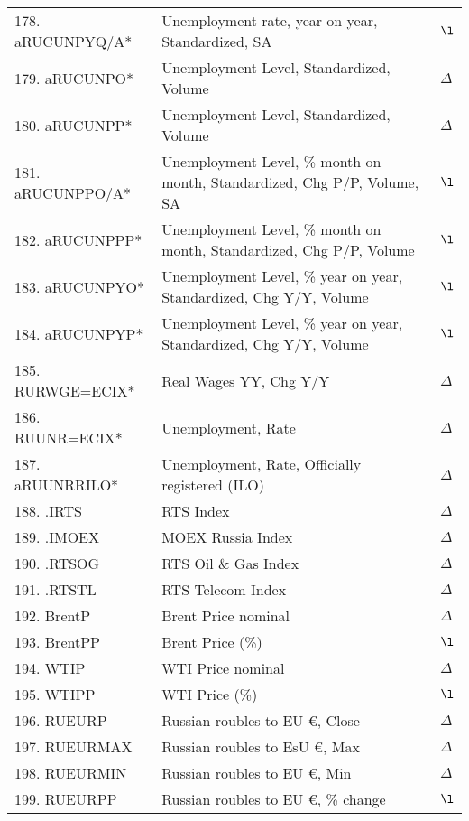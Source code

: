 \documentclass[a4paper, 14pt]{article}
\begin{document}
\begin{center}
\begin{longtable}{p{5.5cm} p{10cm} p{0.15cm}}
	178. aRUCUNPYQ/A* &  Unemployment rate, year on year, Standardized, SA & $\l$\\
	179. aRUCUNPO* &  Unemployment Level, Standardized, Volume & $\Delta$\\
	180. aRUCUNPP* &  Unemployment Level, Standardized, Volume & $\Delta$\\
	181. aRUCUNPPO/A* &  Unemployment Level, \% month on month, Standardized, Chg P/P, Volume, SA & $\l$\\
	182. aRUCUNPPP* &  Unemployment Level, \% month on month, Standardized, Chg P/P, Volume & $\l$\\
	183. aRUCUNPYO* &  Unemployment Level, \% year on year, Standardized, Chg Y/Y, Volume & $\l$\\
	184. aRUCUNPYP* &  Unemployment Level, \% year on year, Standardized, Chg Y/Y, Volume & $\l$\\
	185. RURWGE=ECIX* &  Real Wages YY, Chg Y/Y & $\Delta$\\
	186. RUUNR=ECIX* &  Unemployment, Rate & $\Delta$\\
	187. aRUUNRRILO* &  Unemployment, Rate, Officially registered (ILO) & $\Delta$\\
	188. .IRTS & RTS Index & $\Delta$\\
	189. .IMOEX & MOEX Russia Index & $\Delta$\\
	190. .RTSOG & RTS Oil \& Gas Index & $\Delta$\\
	191. .RTSTL & RTS Telecom Index & $\Delta$\\
	192. BrentP & Brent Price nominal & $\Delta$\\
	193. BrentPP & Brent Price (\%) & $\l$\\
	194. WTIP & WTI Price nominal & $\Delta$\\
	195. WTIPP & WTI Price (\%) & $\l$\\
	196. RUEURP &  Russian roubles to EU \euro{}, Close & $\Delta$\\
	197. RUEURMAX &  Russian roubles to EsU \euro{}, Max & $\Delta$\\
	198. RUEURMIN &  Russian roubles to EU \euro{}, Min & $\Delta$\\
	199. RUEURPP &  Russian roubles to EU \euro{}, \% change & $\l$\\
	\end{longtable}
\end{center}






\newpage


\end{document}
